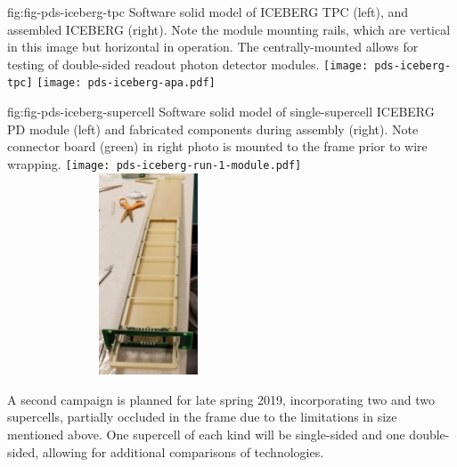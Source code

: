 
 \begin{dunefigure}
 {fig:fig-pds-iceberg-tpc}
 {Software solid model of ICEBERG TPC (left), and assembled ICEBERG  (right).  Note the  module mounting rails, which are vertical in this image but horizontal in operation. The centrally-mounted  allows for testing of double-sided readout photon detector modules.}
\texttt{[image: pds-iceberg-tpc]}
\texttt{[image: pds-iceberg-apa.pdf]}
\end{dunefigure}



\begin{dunefigure}
 {fig:fig-pds-iceberg-supercell}
 {Software solid model of single-supercell ICEBERG PD module (left) and fabricated components during assembly (right).  Note connector board (green) in right photo is mounted to the  frame prior to wire wrapping.}
\texttt{[image: pds-iceberg-run-1-module.pdf]}
\includegraphics[angle=0,width=8.4cm,height=6cm]{graphics/pds-iceberg-module-assembly-photo.pdf}
\end{dunefigure}

A second campaign is planned for late spring 2019, incorporating two  and two  supercells, partially occluded in the frame due to the limitations in  size mentioned above.  One supercell of each kind will be single-sided and one double-sided, allowing for additional comparisons of  technologies.

